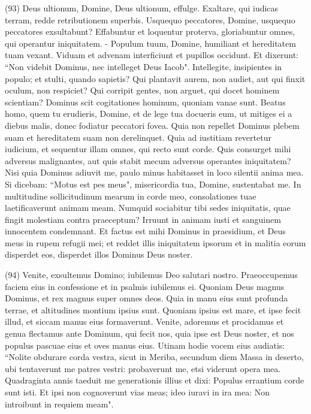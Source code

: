 \begin{biblechapter}  (93) 
\verse Deus ultionum, Domine, Deus ultionum, effulge. 
\verse Exaltare, qui iudicas terram, redde retributionem superbis. 
\verse Usquequo peccatores, Domine, usquequo peccatores exsultabunt? 
\verse Effabuntur et loquentur proterva, gloriabuntur omnes, qui operantur iniquitatem. - 
\verse Populum tuum, Domine, humiliant et hereditatem tuam vexant. 
\verse Viduam et advenam interficiunt et pupillos occidunt. 
\verse Et dixerunt: “Non videbit Dominus, nec intelleget Deus Iacob". 
\verse Intellegite, insipientes in populo; et stulti, quando sapietis? 
\verse Qui plantavit aurem, non audiet, aut qui finxit oculum, non respiciet? 
\verse Qui corripit gentes, non arguet, qui docet hominem scientiam? 
\verse Dominus scit cogitationes hominum, quoniam vanae sunt. 
\verse Beatus homo, quem tu erudieris, Domine, et de lege tua docueris eum, 
\verse ut mitiges ei a diebus malis, donec fodiatur peccatori fovea. 
\verse Quia non repellet Dominus plebem suam et hereditatem suam non derelinquet. 
\verse Quia ad iustitiam revertetur iudicium, et sequentur illam omnes, qui recto sunt corde. 
\verse Quis consurget mihi adversus malignantes, aut quis stabit mecum adversus operantes iniquitatem? 
\verse Nisi quia Dominus adiuvit me, paulo minus habitasset in loco silentii anima mea. 
\verse Si dicebam: “Motus est pes meus", misericordia tua, Domine, sustentabat me. 
\verse In multitudine sollicitudinum mearum in corde meo, consolationes tuae laetificaverunt animam meam. 
\verse Numquid sociabitur tibi sedes iniquitatis, quae fingit molestiam contra praeceptum? 
\verse Irruunt in animam iusti et sanguinem innocentem condemnant. 
\verse Et factus est mihi Dominus in praesidium, et Deus meus in rupem refugii mei; 
\verse et reddet illis iniquitatem ipsorum et in malitia eorum disperdet eos, 
\verse disperdet illos Dominus Deus noster. 
\end{biblechapter}

\begin{biblechapter}  (94) 
\verse Venite, exsultemus Domino; iubilemus Deo salutari nostro. 
\verse Praeoccupemus faciem eius in confessione et in psalmis iubilemus ei. 
\verse Quoniam Deus magnus Dominus, et rex magnus super omnes deos. 
\verse Quia in manu eius sunt profunda terrae, et altitudines montium ipsius sunt. 
\verse Quoniam ipsius est mare, et ipse fecit illud, et siccam manus eius formaverunt. 
\verse Venite, adoremus et procidamus et genua flectamus ante Dominum, qui fecit nos, 
\verse quia ipse est Deus noster, et nos populus pascuae eius et oves manus eius. 
\verse Utinam hodie vocem eius audiatis: “Nolite obdurare corda vestra, 
\verse sicut in Meriba, secundum diem Massa in deserto, ubi tentaverunt me patres vestri: probaverunt me, etsi viderunt opera mea. 
\verse Quadraginta annis taeduit me generationis illius et dixi: Populus errantium corde sunt isti. 
\verse Et ipsi non cognoverunt vias meas; ideo iuravi in ira mea: Non introibunt in requiem meam". 
\end{biblechapter}

